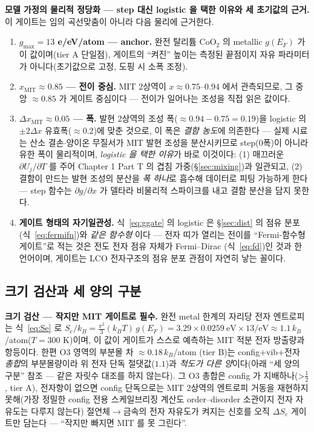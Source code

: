 \textbf{모델 가정의 물리적 정당화 --- step 대신 logistic 을 택한 이유와 세 초기값의 근거.} 이 게이트는 임의 곡선맞춤이 아니라
다음 물리에 근거한다.
\begin{enumerate}[label=(\roman*),leftmargin=2.2em,itemsep=2pt]
\item \textbf{$g_{\max}=13$ e/eV/atom --- anchor.} 완전 탈리튬 $\mathrm{CoO_2}$ 의 metallic $g(E_F)$ 가 이 값이며(tier A 단일점)\cite{motohashi2009}, 게이트의
``켜진'' 높이는 측정된 끝점이지 자유 파라미터가 아니다(초기값으로 고정, 도핑 시 소폭 조정).
\item \textbf{$x_\mathrm{MIT}\approx0.85$ --- 전이 중심.} MIT 2상역이 $x\approx0.75$--$0.94$ 에서 관측되므로\cite{menetrier1999,reimers1992},
그 중앙 $\approx0.85$ 가 게이트 중심이다 --- 전이가 일어나는 조성을 직접 읽은 값이다.
\item \textbf{$\Delta x_\mathrm{MIT}\approx0.05$ --- 폭.} 발현 2상역의 조성 폭($\approx0.94{-}0.75=0.19$)을 logistic 의 $\pm2\Delta x$ 유효폭($\approx0.2$)에 맞춘
것으로, 이 폭은 \emph{결함 농도}에 의존한다 --- 실제 시료는 산소 결손$\cdot$양이온 무질서가 MIT 발현 조성을
분산시키므로 step(0폭)이 아니라 유한 폭이 물리적이며, \emph{logistic 을 택한 이유}가 바로 이것이다: (1) 매끄러운
$\partial U_j/\partial T$ 를 주어 Chapter 1 Part T 의 겹침 가중(\S\ref{sec:mixing})과 일관되고, (2) 결함이 만드는 발현 조성의 분산을 \emph{폭
하나}로 흡수해 데이터로 피팅 가능하게 한다 --- step 함수는 $\partial g/\partial x$ 가 델타라 비물리적 스파이크를
내고 결함 분산을 담지 못한다.
\item \textbf{게이트 형태의 자기일관성.} 식~\eqref{eq:ggate} 의 logistic 은 \S\ref{sec:dist} 의 점유 분포(식~\eqref{eq:fermifn})와 \emph{같은 함수형}
이다 --- 전자 띠가 열리는 전이를 ``Fermi-함수형 게이트''로 적는 것은 전도 전자 점유 자체가 Fermi--Dirac
(식~\eqref{eq:fd})인 것과 한 언어이며, 게이트는 LCO 전자구조의 점유 분포 관점이 자연히 낳는 꼴이다.
\end{enumerate}

\subsection{크기 검산과 세 양의 구분}\label{sec:lco-Se-scale}
\textbf{크기 검산 --- 작지만 MIT 게이트로 필수.} 완전 metal 한계의 자리당 전자 엔트로피는 식~\eqref{eq:Se} 로 $S_e/k_B=\tfrac{\pi^2}{3}(k_BT)\,g(E_F)
=3.29\times0.0259\ \mathrm{eV}\times13/\mathrm{eV}\approx1.1\,k_B$/atom($T{=}300$ K)이며, 이 값이 게이트가
스스로 예측하는 MIT 적분 전자 방출량과 항등이다. 한편 O3 영역의 부분몰 차 $\approx0.18\,k_B$/atom
\cite{reynier2004}(tier B)는 config$+$vib$+$전자 \emph{총합}의 부분몰량이라 위 전자 단독 절댓값($1.1$)과
\emph{척도가 다른 양}이다(아래 ``세 양의 구분'' 참조 --- 같은 자릿수 대조를 하지 않는다). 그 O3 총합은 config 가
지배하나(>$\tfrac12$\cite{reynier2004}, tier A), 전자항이 없으면 config 단독으로는 MIT 2상역의 엔트로피 거동을
재현하지 못해(가장 정밀한 config 전용 스케일브리징 계산\cite{ml2024}도 order--disorder 소관이지 전자
자유도는 다루지 않는다) 절연체$\to$금속의 전자 자유도가 켜지는 신호를 오직 $\Delta S_e$ 게이트만
담는다 --- ``작지만 빠지면 MIT 를 못 그린다''.

